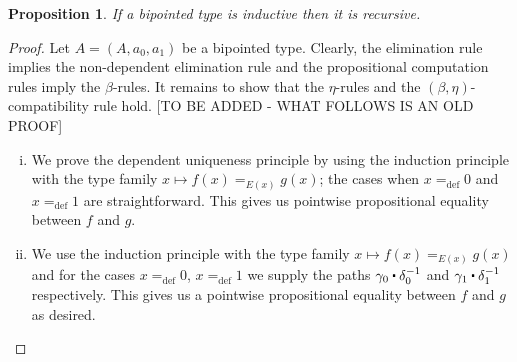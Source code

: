 \documentclass[reqno,10pt,a4paper,oneside]{amsart}
\newcommand{\defeq}{=_{\mathrm{def}}}
\newcommand{\ct}{%
  \mathchoice{\mathbin{\raisebox{0.5ex}{$\displaystyle\centerdot$}}}%
             {\mathbin{\raisebox{0.5ex}{$\centerdot$}}}%
             {\mathbin{\raisebox{0.25ex}{$\scriptstyle\,\centerdot\,$}}}%
             {\mathbin{\raisebox{0.1ex}{$\scriptscriptstyle\,\centerdot\,$}}}}
\numberwithin{equation}{section}
\theoremstyle{mythm}
\newtheorem{proposition}[theorem]{Proposition}
\theoremstyle{mydef}
\theoremstyle{myrmk}
\begin{document}
\begin{proposition} If a bipointed type is inductive then it is recursive.
\end{proposition}


\begin{proof} Let $A = (A, a_0, a_1)$ be a bipointed type. Clearly, the elimination rule implies the non-dependent elimination rule and the
propositional computation rules imply the $\beta$-rules. It remains to show that the $\eta$-rules and the $(\beta,\eta)$-compatibility rule
hold. [TO BE ADDED - WHAT FOLLOWS IS AN OLD PROOF] 
\begin{enumerate}[(i)] 
\item We prove the dependent uniqueness principle by using the induction principle with the type family $x \mapsto f(x) =_{E(x)} g(x)$; the cases when $x \defeq 0$ and $x \defeq 1$ are straightforward. This gives us pointwise propositional equality between $f$ and $g$. 
\item We use the induction principle with the type family $x \mapsto f(x) =_{E(x)} g(x)$ and for the cases $x \defeq 0$, $x \defeq 1$ we supply the paths $\gamma_0 \ct \delta_0^{-1}$ and $\gamma_1 \ct \delta_1^{-1}$ respectively. This gives us a pointwise propositional equality between $f$ and $g$ as desired.
\end{enumerate}
\end{proof}
\end{document}
